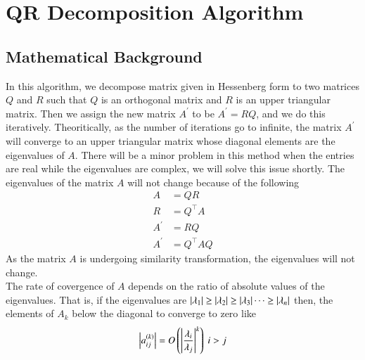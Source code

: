 \documentclass[a4paper,12pt]{article}
\theoremstyle{remark}
\begin{document}
\section{QR Decomposition Algorithm}
\subsection{Mathematical Background}
In this algorithm, we decompose matrix given in Hessenberg form to two matrices $Q$ and $R$ such that $Q$ is an orthogonal matrix and $R$ is an upper triangular matrix. Then we assign the new matrix $A^\prime$ to be $A^\prime = RQ$, and we do this iteratively. Theoritically, as the number of iterations go to infinite, the matrix $A^\prime$ will converge to an upper triangular matrix whose diagonal elements are the eigenvalues of $A$. There will be a minor problem in this method when the entries are real while the eigenvalues are complex, we will solve this issue shortly. The eigenvalues of the matrix $A$ will not change because of the following
\begin{align}
	A &= QR\\
	R &= Q^\top A\\
	A^\prime &= RQ\\
	A^\prime &= Q^\top AQ
\end{align}
As the matrix $A$ is undergoing similarity transformation, the eigenvalues will not change.\\
The rate of covergence of $A$ depends on the ratio of absolute values of the eigenvalues. That is, if the eigenvalues are $\left\vert\lambda_1\right\vert \geq \left\vert\lambda_2\right\vert \geq \left\vert\lambda_3\right\vert \dots \geq \left\vert\lambda_n\right\vert$ then, the elements of $A_k$ below the diagonal to converge to zero like
\begin{align}
    \left\vert a_{ij}^{\left(k\right)}\right\vert = O\left(\left\vert\frac{\lambda_i}{\lambda_j}\right\vert^k\right)\text{    } i > j
\end{align}
\end{document}
